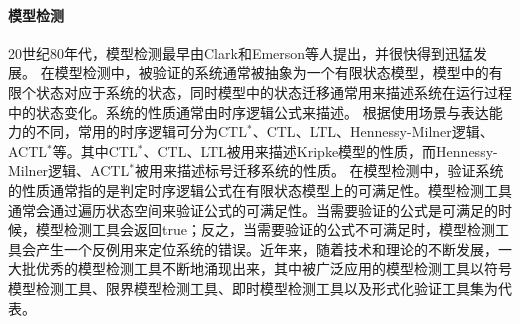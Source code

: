\paragraph{模型检测}
20世纪80年代，模型检测\cite{CGP01,BouajjaniJNT00,BaierKatoen08}最早由Clark和Emerson等人提出，并很快得到迅猛发展。
在模型检测中，被验证的系统通常被抽象为一个有限状态模型，模型中的有限个状态对应于系统的状态，同时模型中的状态迁移通常用来描述系统在运行过程中的状态变化。系统的性质通常由时序逻辑公式来描述。
根据使用场景与表达能力的不同，常用的时序逻辑可分为\textsf{CTL}$^*$\cite{EmersonH86}、\textsf{CTL}\cite{ClarkeE08}、\textsf{LTL}\cite{Pnueli77}、Hennessy-Milner逻辑\cite{HennessyM85}、\textsf{ACTL}$^*$\cite{NicolaV90}等。其中\textsf{CTL}$^*$、\textsf{CTL}、\textsf{LTL}被用来描述Kripke模型的性质，而Hennessy-Milner逻辑、\textsf{ACTL}$^*$被用来描述标号迁移系统的性质。
在模型检测中，验证系统的性质通常指的是判定时序逻辑公式在有限状态模型上的可满足性。模型检测工具通常会通过遍历状态空间来验证公式的可满足性。当需要验证的公式是可满足的时候，模型检测工具会返回true；反之，当需要验证的公式不可满足时，模型检测工具会产生一个反例用来定位系统的错误。近年来，随着技术和理论的不断发展，一大批优秀的模型检测工具不断地涌现出来，其中被广泛应用的模型检测工具以符号模型检测工具\nusmv{}\cite{CimattiCGR99}、限界模型检测工具\verds{}\cite{Zhang14}、即时模型检测工具\cite{Holzmann97}以及形式化验证工具集\CADP{}\cite{GaravelLMS13}为代表。
